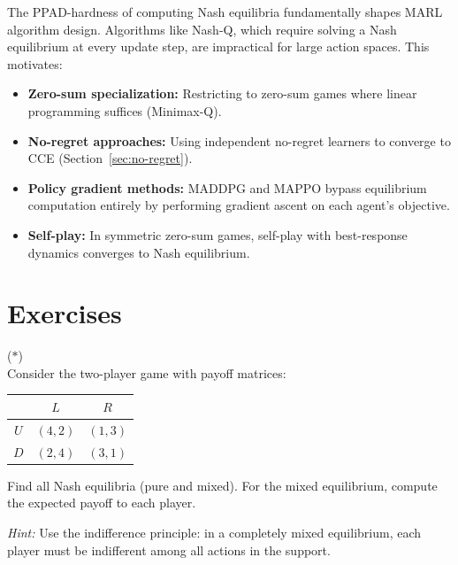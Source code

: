 \documentclass[11pt,a4paper]{article}
\begin{document}
\begin{rlconnection}[title={Computational Complexity and MARL Algorithm Design}]
The PPAD-hardness of computing Nash equilibria fundamentally shapes
MARL algorithm design.  Algorithms like Nash-Q, which require solving
a Nash equilibrium at every update step, are impractical for large
action spaces.  This motivates:
\begin{itemize}[nosep]
  \item \textbf{Zero-sum specialization:} Restricting to zero-sum
    games where linear programming suffices (Minimax-Q).
  \item \textbf{No-regret approaches:} Using independent no-regret
    learners to converge to CCE (Section~\ref{sec:no-regret}).
  \item \textbf{Policy gradient methods:} MADDPG and MAPPO bypass
    equilibrium computation entirely by performing gradient ascent
    on each agent's objective.
  \item \textbf{Self-play:} In symmetric zero-sum games, self-play
    with best-response dynamics converges to Nash equilibrium.
\end{itemize}
\end{rlconnection}

\section{Exercises}
\label{sec:exercises}

\begin{exercise}
  \textnormal{(\(*\))} \\
  Consider the two-player game with payoff matrices:
  \begin{center}
  \begin{tabular}{c|cc}
    & $L$ & $R$ \\ \hline
    $U$ & $(4, 2)$ & $(1, 3)$ \\
    $D$ & $(2, 4)$ & $(3, 1)$
  \end{tabular}
  \end{center}
  Find all Nash equilibria (pure and mixed).  For the mixed
  equilibrium, compute the expected payoff to each player.

  \textit{Hint:} Use the indifference principle: in a completely
  mixed equilibrium, each player must be indifferent among all
  actions in the support.
\end{exercise}
\end{document}
